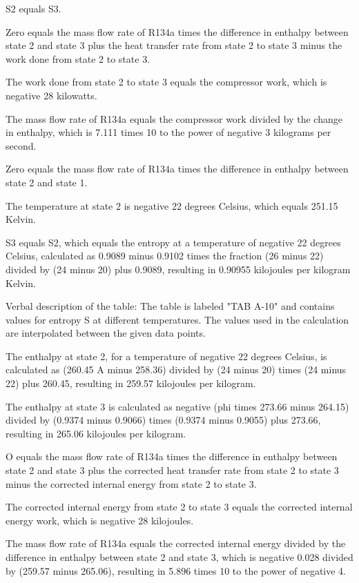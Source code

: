 S2 equals S3.

Zero equals the mass flow rate of R134a times the difference in enthalpy between state 2 and state 3 plus the heat transfer rate from state 2 to state 3 minus the work done from state 2 to state 3.

The work done from state 2 to state 3 equals the compressor work, which is negative 28 kilowatts.

The mass flow rate of R134a equals the compressor work divided by the change in enthalpy, which is 7.111 times 10 to the power of negative 3 kilograms per second.

Zero equals the mass flow rate of R134a times the difference in enthalpy between state 2 and state 1.

The temperature at state 2 is negative 22 degrees Celsius, which equals 251.15 Kelvin.

S3 equals S2, which equals the entropy at a temperature of negative 22 degrees Celsius, calculated as 0.9089 minus 0.9102 times the fraction (26 minus 22) divided by (24 minus 20) plus 0.9089, resulting in 0.90955 kilojoules per kilogram Kelvin.

Verbal description of the table: The table is labeled "TAB A-10" and contains values for entropy S at different temperatures. The values used in the calculation are interpolated between the given data points.

The enthalpy at state 2, for a temperature of negative 22 degrees Celsius, is calculated as (260.45 A minus 258.36) divided by (24 minus 20) times (24 minus 22) plus 260.45, resulting in 259.57 kilojoules per kilogram.

The enthalpy at state 3 is calculated as negative (phi times 273.66 minus 264.15) divided by (0.9374 minus 0.9066) times (0.9374 minus 0.9055) plus 273.66, resulting in 265.06 kilojoules per kilogram.

O equals the mass flow rate of R134a times the difference in enthalpy between state 2 and state 3 plus the corrected heat transfer rate from state 2 to state 3 minus the corrected internal energy from state 2 to state 3.

The corrected internal energy from state 2 to state 3 equals the corrected internal energy work, which is negative 28 kilojoules.

The mass flow rate of R134a equals the corrected internal energy divided by the difference in enthalpy between state 2 and state 3, which is negative 0.028 divided by (259.57 minus 265.06), resulting in 5.896 times 10 to the power of negative 4.